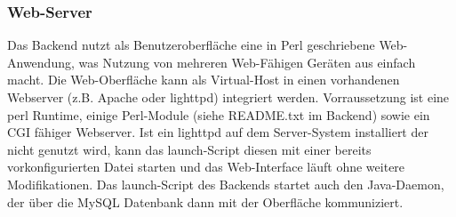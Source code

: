 \documentclass[12pt,a4paper]{article}
\begin{document}
\subsubsection{Web-Server}
Das Backend nutzt als Benutzeroberfläche eine in Perl geschriebene Web-Anwendung, was Nutzung von mehreren Web-Fähigen Geräten aus einfach macht. Die Web-Oberfläche kann als Virtual-Host in einen vorhandenen Webserver (z.B. Apache oder lighttpd) integriert werden. Vorraussetzung ist eine perl Runtime, einige Perl-Module (siehe README.txt im Backend) sowie ein CGI fähiger Webserver. Ist ein lighttpd auf dem Server-System installiert der nicht genutzt wird, kann das launch-Script diesen mit einer bereits vorkonfigurierten Datei starten und das Web-Interface läuft ohne weitere Modifikationen.
Das launch-Script des Backends startet auch den Java-Daemon, der über die MySQL Datenbank dann mit der Oberfläche kommuniziert.
		
\end{document}
